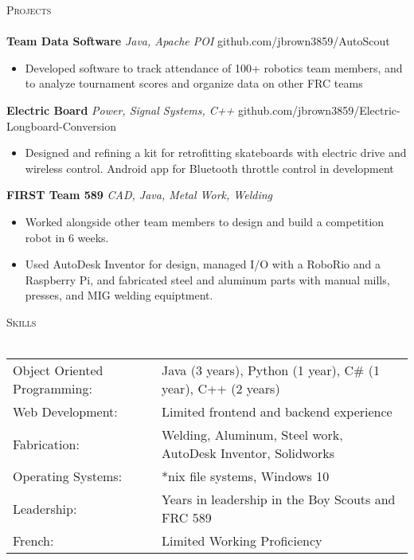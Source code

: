 \documentclass[a4paper]{article}
\newcommand{\lineunder} {
    \vspace*{-8pt} \\
    \hspace*{-18pt} \hrulefill \\
}
\newcommand{\header} [1] {
    {\hspace*{-18pt}\vspace*{6pt} \textsc{#1}}
    \vspace*{-6pt} \lineunder
}
\begin{document}
\header{Projects}
{\textbf{Team Data Software}} {\sl Java, Apache POI} \hfill github.com/jbrown3859/AutoScout\\
\begin{itemize} \itemsep 1pt
	\item Developed software to track attendance of 100+ robotics team members, and to analyze tournament scores and organize data on other FRC teams\\
\end{itemize}
\vspace*{2mm}
{\textbf{Electric Board}} {\sl Power, Signal Systems, C++} \hfill github.com/jbrown3859/Electric-Longboard-Conversion\\
\begin{itemize} \itemsep 1pt
	\item Designed and refining a kit for retrofitting skateboards with electric drive and wireless control. Android app for Bluetooth throttle control in development\\
\end{itemize}
\vspace*{2mm}
{\textbf{FIRST Team 589}} {\sl CAD, Java, Metal Work, Welding} \\
\begin{itemize} \itemsep 1pt
	\item Worked alongside other team members to design and build a competition robot in 6 weeks.\\
  	\item Used AutoDesk Inventor for design, managed I/O with a RoboRio and a Raspberry Pi, and fabricated steel and aluminum parts with manual mills, presses, and MIG welding equiptment.\\
\end{itemize}
\vspace*{2mm}

\header{Skills}
\begin{tabular}{ l l }
	Object Oriented Programming: & Java (3 years), Python (1 year), C\# (1 year), C++ (2 years) \\
	Web Development:             & Limited frontend and backend experience                      \\
	Fabrication:                 & Welding, Aluminum, Steel work, AutoDesk Inventor, Solidworks \\
	Operating Systems:           & *nix file systems, Windows 10                                \\
	Leadership:                  & Years in leadership in the Boy Scouts and FRC 589            \\
	French:                      & Limited Working Proficiency                                  \\
\end{tabular}
\end{document}
